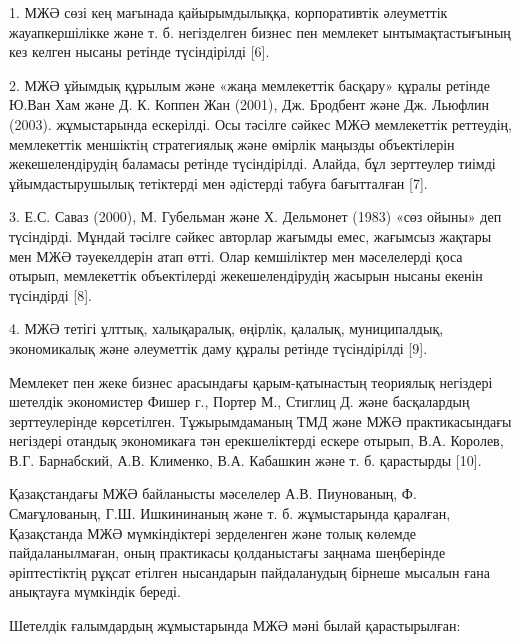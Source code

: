 \begin{multicols}{2}
1. МЖӘ сөзі кең мағынада қайырымдылыққа, корпоративтік әлеуметтік
жауапкершілікке және т. б. негізделген бизнес пен мемлекет
ынтымақтастығының кез келген нысаны ретінде түсіндірілді {[}6{]}.

2. МЖӘ ұйымдық құрылым және «жаңа мемлекеттік басқару» құралы ретінде
Ю.Ван Хам және Д. К. Коппен Жан (2001), Дж. Бродбент және Дж. Льюфлин
(2003). жұмыстарында ескерілді. Осы тәсілге сәйкес МЖӘ мемлекеттік
реттеудің, мемлекеттік меншіктің стратегиялық және өмірлік маңызды
объектілерін жекешелендірудің баламасы ретінде түсіндірілді. Алайда, бұл
зерттеулер тиімді ұйымдастырушылық тетіктерді мен әдістерді табуға
бағытталған {[}7{]}.

3. Е.С. Саваз (2000), М. Губельман және Х. Дельмонет (1983) «сөз ойыны»
деп түсіндірді. Мұндай тәсілге сәйкес авторлар жағымды емес, жағымсыз
жақтары мен МЖӘ тәуекелдерін атап өтті. Олар кемшіліктер мен мәселелерді
қоса отырып, мемлекеттік объектілерді жекешелендірудің жасырын нысаны
екенін түсіндірді {[}8{]}.

4. МЖӘ тетігі ұлттық, халықаралық, өңірлік, қалалық, муниципалдық,
экономикалық және әлеуметтік даму құралы ретінде түсіндірілді {[}9{]}.

Мемлекет пен жеке бизнес арасындағы қарым-қатынастың теориялық негіздері
шетелдік экономистер Фишер г., Портер М., Стиглиц Д. және басқалардың
зерттеулерінде көрсетілген. Тұжырымдаманың ТМД және МЖӘ практикасындағы
негіздері отандық экономикаға тән ерекшеліктерді ескере отырып, В.А.
Королев, В.Г. Барнабский, А.В. Клименко, В.А. Кабашкин және т. б.
қарастырды {[}10{]}.

Қазақстандағы МЖӘ байланысты мәселелер А.В. Пиунованың, Ф. Смағұлованың,
Г.Ш. Ишкининаның және т. б. жұмыстарында қаралған, Қазақстанда МЖӘ
мүмкіндіктері зерделенген және толық көлемде пайдаланылмаған, оның
практикасы қолданыстағы заңнама шеңберінде әріптестіктің рұқсат етілген
нысандарын пайдаланудың бірнеше мысалын ғана анықтауға мүмкіндік береді.

Шетелдік ғалымдардың жұмыстарында МЖӘ мәні былай қарастырылған:


\end{multicols}
